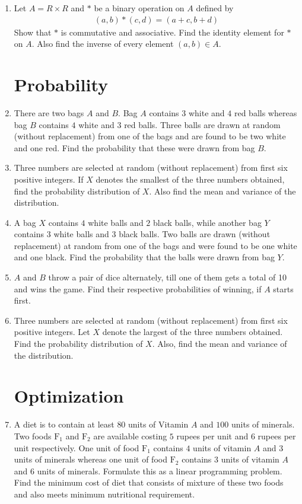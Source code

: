 \documentclass[12pt,-letter paper]{article}
\begin{document}
\begin{enumerate}
	\item Let $A = R \times R$ and $*$ be a binary operation on $A$ defined by
	\begin{align*}
		(a, b) * (c, d) = (a + c, b + d)
	\end{align*}
	Show that $*$ is commutative and associative. Find the identity element for $*$
on $A$. Also find the inverse of every element $(a, b) \in A$.
	
	

\section{Probability}
	\item There are two bags $A$ and $B$. Bag $A$ contains $3$ white and $4$ red balls whereas bag $B$ contains $4$ white and $3$ red balls. Three balls are drawn at random (without replacement) from one of the bags and are found to be two white and one red. Find the probability that these were drawn from bag $B$.

	\item Three numbers are selected at random (without replacement) from first six positive integers. If $X$ denotes the smallest of the three numbers obtained, find the probability distribution of $X$. Also find the mean and variance of the distribution.


	\item A bag $X$ contains $4$ white balls and $2$ black balls, while another bag $Y$ contains
$3$ white balls and $3$ black balls. Two balls are drawn (without replacement) at
random from one of the bags and were found to be one white and one black.
Find the probability that the balls were drawn from bag $Y$.

	\item $A$ and $B$ throw a pair of dice alternately, till one of them gets a total of 10 and
wins the game. Find their respective probabilities of winning, if $A$ starts first.

	\item Three numbers are selected at random (without replacement) from first six
positive integers. Let $X$ denote the largest of the three numbers obtained. Find
the probability distribution of $X$. Also, find the mean and variance of the
distribution.


\section{Optimization}
	\item A diet is to contain at least $80$ units of Vitamin $A$ and $100$ units of minerals. 
Two foods $\text{F}_1$ and $\text{F}_2$ are available costing $5$ rupees per unit and $6$ rupees per unit respectively. 
One unit of food $\text{F}_1$ contains $4$ units of vitamin $A$ and $3$ units of minerals whereas
 one unit of food $\text{F}_2$ contains $3$ units of vitamin $A$ and $6$ units of minerals. 
 Formulate this as a linear programming problem. Find the minimum cost of diet that consists of mixture of these two foods and also meets minimum nutritional requirement.
 

\end{enumerate}
\end{document}
